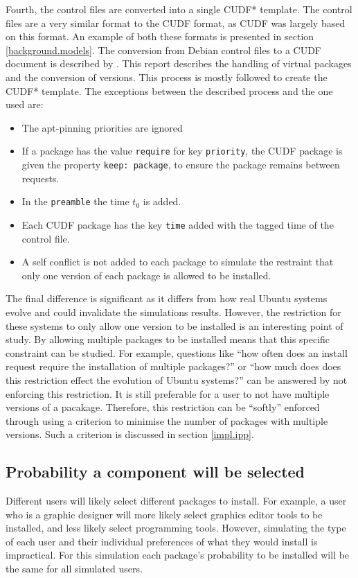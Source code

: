 Fourth, the control files are converted into a single CUDF* template.
The control files are a very similar format to the CUDF format, as CUDF was largely based on this format.
An example of both these formats is presented in section \ref{background.models}.
The conversion from Debian control files to a CUDF document is described by \cite{abatetrenen2010}.
This report describes the handling of virtual packages and the conversion of versions. 
This process is mostly followed to create the CUDF* template.
The exceptions between the described process and the one used are:
\begin{itemize}
  \item The apt-pinning priorities are ignored
  \item If a package has the value \texttt{require} for key \texttt{priority}, the CUDF package is given the property \texttt{keep: package}, to ensure the package remains between requests.
  \item In the \texttt{preamble} the time $t_0$ is added.
  \item Each CUDF package has the key \texttt{time} added with the tagged time of the control file.
  \item A self conflict is not added to each package to simulate the restraint that only one version of each package is allowed to be installed.
\end{itemize} 
The final difference is significant as it differs from how real Ubuntu systems evolve and could invalidate the simulations results.
However, the restriction for these systems to only allow one version to be installed is an interesting point of study.
By allowing multiple packages to be installed means that this specific constraint can be studied.
For example, questions like ``how often does an install request require the installation of multiple packages?'' 
or ``how much does does this restriction effect the evolution of Ubuntu systems?'' can be answered by not enforcing this restriction.
It is still preferable for a user to not have multiple versions of a pacakage.
Therefore, this restriction can be ``softly'' enforced through using a criterion to minimise the number of packages with multiple versions.
Such a criterion is discussed in section \ref{impl.ipp}.

\subsection{Probability a component will be selected}
Different users will likely select different packages to install.
For example, a user who is a graphic designer will more likely select graphics editor tools to be installed, and less likely select programming tools.
However, simulating the type of each user and their individual preferences of what they would install is impractical.
For this simulation each package's probability to be installed will be the same for all simulated users.

